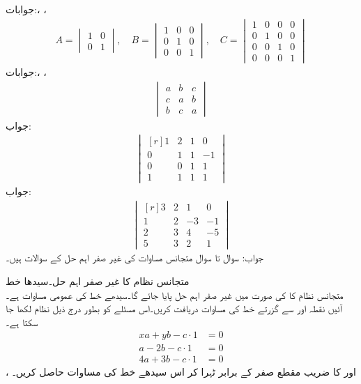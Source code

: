 جوابات:، ، 
\begin{align*}
A=\begin{vmatrix}
1&0\\
0&1
\end{vmatrix}, \quad
B=\begin{vmatrix}
1&0&0\\
0&1&0\\
0&0&1
\end{vmatrix},\quad 
C=\begin{vmatrix}
1&0&0&0\\
0&1&0&0\\
0&0&1&0\\
0&0&0&1
\end{vmatrix}
\end{align*}
جوابات:، ، 
\begin{align*}
\begin{vmatrix}
a&b&c\\
c&a&b\\
b&c&a
\end{vmatrix}
\end{align*}
جواب:
\begin{align*}
\begin{vmatrix*}[r]
1&2&1&0\\
0&1&1&-1\\
0&0&1&1\\
1&1&1&1
\end{vmatrix*}
\end{align*}
جواب:
\begin{align*}
\begin{vmatrix*}[r]
3&2&1&0\\
1&2&-3&-1\\
2&3&4&-5\\
5&3&2&1
\end{vmatrix*}
\end{align*}
جواب:
سوال  تا سوال  متجانس مساوات کی غیر صفر اہم حل کے سوالات ہیں۔

\quad متجانس نظام کا غیر صفر اہم حل۔سیدھا خط\\
متجانس نظام کا  کی صورت میں غیر صفر اہم حل پایا جائے گا۔سیدھے خط کی عمومی مساوات  ہے۔آئیں نقطہ  اور  سے گزرتے خط کی مساوات دریافت کریں۔اس مسئلے کو بطور درج ذیل نظام لکھا جا سکتا ہے۔
\begin{align*}
xa+yb-c\cdot 1&=0\\
a-2b-c\cdot1&=0\\
4a+3b-c\cdot1&=0
\end{align*} 
،  اور  کا  ضریب  مقطع صفر کے برابر ٹہرا کر اس سیدھے خط کی مساوات حاصل کریں۔

